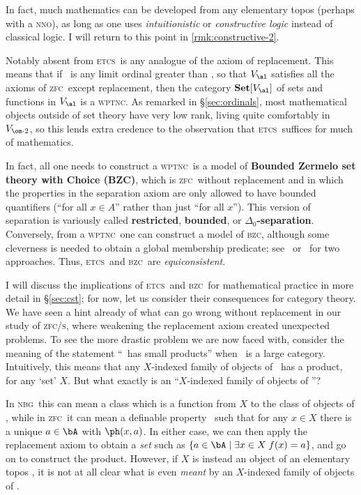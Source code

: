 \documentclass[12pt]{amsart}
\newcommand{\Set}{\ensuremath{\mathbf{Set}}}
\def\zfc{\textsc{zfc}}
\def\zfcs{\textsc{zfc/s}}
\def\nbg{\textsc{nbg}}
\def\wptnc{\textsc{wptnc}}
\def\etcs{\textsc{etcs}}
\def\bzc{\textsc{bzc}}
\def\nno{\textsc{nno}}
\begin{document}
\begin{rmk}\label{rmk:constructive-1}
  In fact, much mathematics can be developed from any elementary topos
  (perhaps with a \nno), as long as one uses \emph{intuitionistic} or
  \emph{constructive logic} instead of classical logic.  I will return
  to this point in \autoref{rmk:constructive-2}.
\end{rmk}

Notably absent from \etcs\ is any analogue of the axiom of
replacement.  This means that if \al\ is any limit ordinal greater
than \om, so that $V_\al$ satisfies all the axioms of \zfc\ except
replacement, then the category $\Set[V_\al]$ of sets and functions in
$V_\al$ is a \wptnc.  As remarked in \S\ref{sec:ordinals}, most
mathematical objects outside of set theory have very low rank, living
quite comfortably in $V_{\om\cdot 2}$, so this lends extra credence to
the observation that \etcs\ suffices for much of mathematics.

In fact, all one needs to construct a \wptnc\ is a model of
\textbf{Bounded Zermelo set theory with Choice (BZC)}, which is \zfc\
without replacement and in which the properties in the separation
axiom are only allowed to have bounded quantifiers (``for all $x\in
A$'' rather than just ``for all $x$'').  This version of separation is
variously called \textbf{restricted}, \textbf{bounded}, or
\textbf{$\Delta_0$-separation}.  Conversely, from a \wptnc\ one can
construct a model of \bzc, although some cleverness is needed to
obtain a global membership predicate; see~\cite[VI.10]{mm:shv-gl}
or~\cite[Ch.~9]{ptj:topos-theory} for two approaches.  Thus, \etcs\
and \bzc\ are \emph{equiconsistent}.

I will discuss the implications of \etcs\ and \bzc\ for mathematical
practice in more detail in \S\ref{sec:cst}; for now, let us consider
their consequences for category theory.  We have seen a hint already
of what can go wrong without replacement in our study of \zfcs, where
weakening the replacement axiom created unexpected problems.  To see
the more drastic problem we are now faced with, consider the meaning
of the statement ``\bA\ has small products'' when \bA\ is a large
category.  Intuitively, this means that any $X$-indexed family of
objects of \bA\ has a product, for any `set' $X$.  But what exactly is
an ``$X$-indexed family of objects of \bA''?

In \nbg\ this can mean a class which is a function from $X$ to the
class of objects of \bA, while in \zfc\ it can mean a definable
property \ph\ such that for any $x\in X$ there is a unique $a\in \bA$
with $\ph(x,a)$.  In either case, we can then apply the replacement
axiom to obtain a \emph{set} such as $\{a\in \bA \mid \exists x\in X\;
f(x)=a\}$, and go on to construct the product.  However, if $X$ is
instead an object of an elementary topos \bS, it is not at all clear
what is even \emph{meant} by an $X$-indexed family of objects of \bA.
\end{document}

